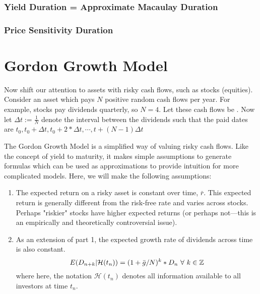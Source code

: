 \documentclass[12pt]{scrartcl}
\begin{document}
\subsubsection{Yield Duration = Approximate Macaulay Duration}

\subsubsection{Price Sensitivity Duration}

\section{Gordon Growth Model}

Now shift our attention to assets with risky cash flows, such as stocks (equities). Consider an asset which pays $N$ positive random cash flows per year. For example, stocks pay dividends quarterly, so $N = 4$. Let these cash flows be . Now let
$\Delta t := \frac{1}{N}$ denote the interval between the dividends such that the paid dates are $t_0, t_0 + \Delta t, t_0 + 2 * \Delta t, \cdots, t + (N - 1)\Delta t$

\begin{note}
    The Gordon Growth Model is a simplified way of valuing risky cash flows. Like the concept of yield to maturity, it makes simple assumptions to generate formulas which can be used as approximations to provide intuition for more complicated models. Here, we will make the following assumptions:
    \begin{enumerate}
        \item The expected return on a risky asset is constant over time, $\bar{r}$. This expected return is generally different from the risk-free rate and varies across stocks. Perhaps "riskier" stocks have higher expected returns (or perhaps not---this is an empirically and theoretically controversial issue).
        \item As an extension of part 1, the expected growth rate of dividends across time is also constant.
\[E(D_{n+k} | \mathcal{H}(t_n)) = (1 + \bar{g} / N)^k * D_n\ \forall \ k \in \mathbb Z\]
where here, the notation $\mathcal{H}(t_n)$ denotes all information available to all investors at time $t_n$.
    \end{enumerate}
\end{note}

\end{document}
